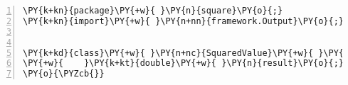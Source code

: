 \begin{Verbatim}[commandchars=\\\{\},numbers=left,firstnumber=1,stepnumber=1,frame=single,fontsize=\small]
\PY{k+kn}{package}\PY{+w}{ }\PY{n}{square}\PY{o}{;}
\PY{k+kn}{import}\PY{+w}{ }\PY{n+nn}{framework.Output}\PY{o}{;}


\PY{k+kd}{class}\PY{+w}{ }\PY{n+nc}{SquaredValue}\PY{+w}{ }\PY{k+kd}{implements}\PY{+w}{ }\PY{n}{Output}\PY{+w}{ }\PY{o}{\PYZob{}}
\PY{+w}{    }\PY{k+kt}{double}\PY{+w}{ }\PY{n}{result}\PY{o}{;}
\PY{o}{\PYZcb{}}
\end{Verbatim}
